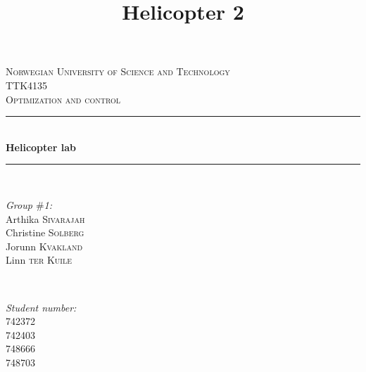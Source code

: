 \documentclass[12pt, a4paper]{article}%
\title{Helicopter 2}
\begin{document}



\begin{titlepage}

\newcommand{\HRule}{\rule{\linewidth}{0.5mm}} %

\center %
 

\textsc{\LARGE Norwegian University of Science and Technology}\\[1.5cm] %
\textsc{\Large TTK4135}\\[0.5cm] %
\textsc{\large Optimization and control}\\[0.5cm] %


\HRule \\[0.4cm]
{ \huge \bfseries Helicopter lab}\\[0.4cm] %
\HRule \\[1.5cm]
 

\begin{minipage}{0.4\textwidth}
\begin{flushleft} \large
\emph{Group $\#$1:}\\
Arthika \textsc{Sivarajah}\\
Christine \textsc{Solberg}\\
Jorunn \textsc{Kvakland}\\
Linn \textsc{ter Kuile}
\end{flushleft}
\end{minipage}
~
\begin{minipage}{0.4\textwidth}
\begin{flushright} \large
\emph{Student number:} \\
742372\\
742403\\
748666\\
748703
\end{flushright}
\end{minipage}\\[2cm]


\end{titlepage}
\end{document}
